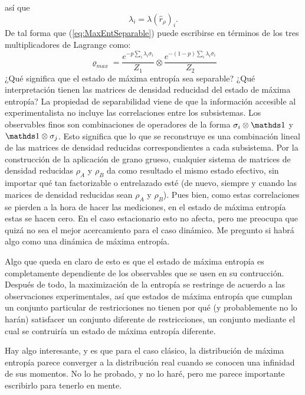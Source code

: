 así que
\begin{equation*}
  \lambda_{i}=\lambda(\hat{r}_{\rho})_{i}.
\end{equation*}
De tal forma que (\ref{eq:MaxEntSeparable}) puede escribirse en términos de los tres multiplicadores de Lagrange como:
\begin{equation*}
\varrho_{max}=\frac{e^{-p\sum_{i}\lambda_{i}\sigma_{i}}}{Z_{1}} \otimes \frac{e^{-(1-p)\sum_{i}\lambda_{i}\sigma_{i}}}{Z_{2}}
\end{equation*}
¿Qué significa que el estado de máxima entropía sea separable? ¿Qué interpretación tienen las matrices de densidad reducidad del estado de máxima entropía? La propiedad de separabilidad viene de que la información accesible al experimentalista no incluye las correlaciones entre los subsistemas. Los observables finos son combinaciones de operadores de la forma $\pauli{i}\otimes\Id$ y $\Id\otimes\pauli{j}$. Esto significa que lo que se reconstruye es una combinación lineal de las matrices de densidad reducidas correspondientes a cada subsistema. Por la construcción de la aplicación de grano grueso, cualquier sistema de matrices de densidad reducidas $\rho_{A}$ y $\rho_{B}$ da como resultado el mismo estado efectivo, sin importar qué tan factorizable o entrelazado esté (de nuevo, siempre y cuando las marices de densidad reducidas sean $\rho_{A}$ y $\rho_{B}$). Pues bien, como estas correlaciones se pierden a la hora de hacer las mediciones, en el estado de máxima entropía estas se hacen cero. En el caso estacionario esto no afecta, pero me preocupa que quizá no sea el mejor acercamiento para el caso dinámico. Me pregunto si habrá algo como una dinámica de máxima entropía. 

Algo que queda en claro de esto es que el estado de máxima entropía es completamente dependiente de los observables que se usen en su contrucción. Después de todo, la maximización de la entropía se restringe de acuerdo a las observaciones experimentales, así que estados de máxima entropía que cumplan un conjunto particular de restricciones no tienen por qué (y probablemente no lo harán) satisfacer un conjunto diferente de restricciones, un conjunto mediante el cual se contruiría un estado de máxima entropía diferente.

Hay algo interesante, y es que para el caso clásico, la distribución de máxima entropía parece converger a la distribución real cuando se conocen una infinidad de sus momentos. No lo he probado, y no lo haré, pero me parece importante escribirlo para tenerlo en mente.

